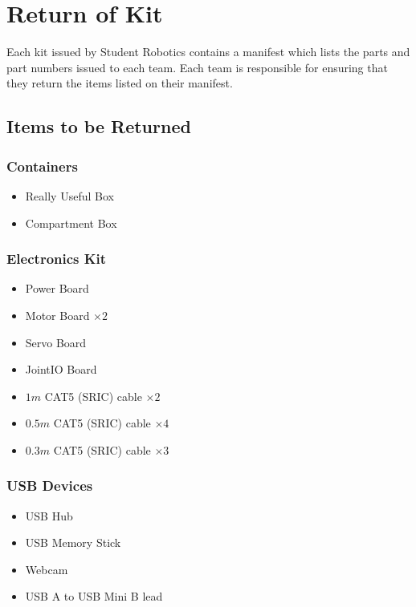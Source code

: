 \section {Return of Kit}
\label{sec:kit-return}

Each kit issued by Student Robotics contains a manifest which lists the parts and part numbers issued to each team.
Each team is responsible for ensuring that they return the items listed on their manifest.

\subsection {Items to be Returned}

\subsubsection {Containers}

\begin{itemize}
 \item Really Useful Box
 \item Compartment Box
\end{itemize}

\subsubsection {Electronics Kit}

\begin{itemize}
 \item Power Board
 \item Motor Board $\times 2$
 \item Servo Board
 \item JointIO Board
 \item $  1m$ CAT5 (SRIC) cable $\times 2$
 \item $0.5m$ CAT5 (SRIC) cable $\times 4$
 \item $0.3m$ CAT5 (SRIC) cable $\times 3$
\end{itemize}

\subsubsection {USB Devices}

\begin{itemize}
 \item USB Hub
 \item USB Memory Stick
 \item Webcam
 \item USB A to USB Mini B lead
\end{itemize}

